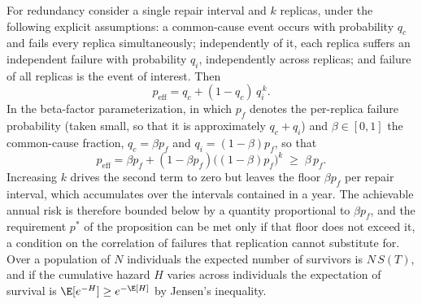 For redundancy consider a single repair interval and $k$ replicas, under the following explicit assumptions: a common-cause event occurs with probability $q_c$ and fails every replica simultaneously; independently of it, each replica suffers an independent failure with probability $q_i$, independently across replicas; and failure of all replicas is the event of interest. Then
\[
p_{\mathrm{eff}}=q_c+(1-q_c)\,q_i^{\,k}.
\]
In the beta-factor parameterization, in which $p_f$ denotes the per-replica failure probability (taken small, so that it is approximately $q_c+q_i$) and $\beta\in[0,1]$ the common-cause fraction, $q_c=\beta p_f$ and $q_i=(1-\beta)p_f$, so that
\[
p_{\mathrm{eff}}=\beta p_f+(1-\beta p_f)\big((1-\beta)p_f\big)^{k}\;\ge\;\beta\,p_f.
\]
Increasing $k$ drives the second term to zero but leaves the floor $\beta p_f$ per repair interval, which accumulates over the intervals contained in a year. The achievable annual risk is therefore bounded below by a quantity proportional to $\beta p_f$, and the requirement $p^\ast$ of the proposition can be met only if that floor does not exceed it, a condition on the correlation of failures that replication cannot substitute for. Over a population of $N$ individuals the expected number of survivors is $N\,S(T)$, and if the cumulative hazard $H$ varies across individuals the expectation of survival is $\E[e^{-H}]\ge e^{-\E[H]}$ by Jensen's inequality.
